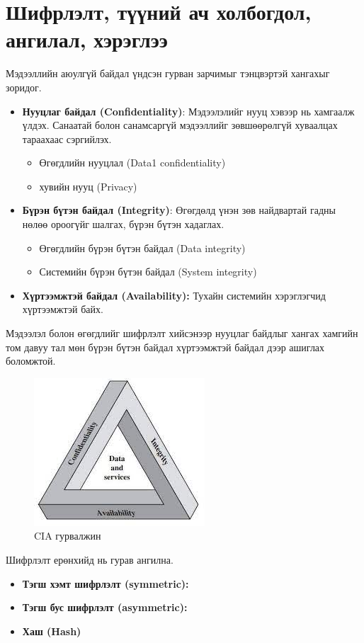 \section{Шифрлэлт, түүний ач холбогдол, ангилал, хэрэглээ}
Мэдээллийн аюулгүй байдал үндсэн гурван зарчимыг тэнцвэртэй хангахыг зоридог. 
\begin{itemize}
    \item \textbf{Нууцлаг байдал (Confidentiality)}: Мэдээлэлийг нууц хэвээр нь хамгаалж үлдэх. Санаатай болон санамсаргүй мэдээллийг зөвшөөрөлгүй хуваалцах тараахаас сэргийлэх.
    \begin{itemize}
        \item Өгөгдлийн нууцлал (Data1 confidentiality)
        \item хувийн нууц (Privacy)
    \end{itemize}
    \item \textbf{Бүрэн бүтэн байдал (Integrity)}: Өгөгдөлд үнэн зөв найдвартай гадны нөлөө ороогүйг шалгах, бүрэн бүтэн хадаглах. 
    \begin{itemize}
        \item Өгөгдлийн бүрэн бүтэн байдал (Data integrity)
        \item Системийн бүрэн бүтэн байдал (System integrity) 
    \end{itemize}
    \item \textbf{Хүртээмжтэй байдал (Availability):} Тухайн системийн хэрэглэгчид хүртээмжтэй байх.
\end{itemize}
Мэдээлэл болон өгөгдлийг шифрлэлт хийсэнээр нууцлаг байдлыг хангах хамгийн том давуу тал мөн бүрэн бүтэн байдал хүртээмжтэй байдал дээр ашиглах боломжтой.
\begin{figure}[ht]
\centering
\includegraphics[scale=0.7]{Figures/cia_traid}
\caption[CIA гурвалжин]{CIA гурвалжин}
\label{fig:Electron}
\end{figure}

Шифрлэлт ерөнхийд нь гурав ангилна.
\begin{itemize}
    \item \textbf{Тэгш хэмт шифрлэлт (symmetric):}
    \item \textbf{Тэгш бус шифрлэлт (asymmetric):}
    \item \textbf{Хаш (Hash)}
\end{itemize}

